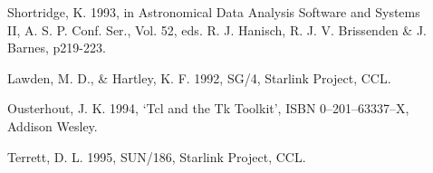\documentclass[a4paper]{book}
\renewcommand{\_}{{\tt\char'137}}
\begin{document}
\begin{description}
\item[] Shortridge, K. 1993, in  Astronomical Data Analysis Software
      and Systems II, A. S. P. Conf. Ser., Vol. 52, eds. R. J. Hanisch,
      R. J. V. Brissenden \& J. Barnes, p219-223.
\item[] Lawden, M. D., \& Hartley, K. F. 1992, SG/4, Starlink Project, CCL.
\item[] Ousterhout, J. K. 1994, `Tcl and the Tk Toolkit', ISBN 0--201--63337--X, Addison Wesley.
\item[] Terrett, D. L. 1995, SUN/186, Starlink Project, CCL.
\end{description}
\end{document}
